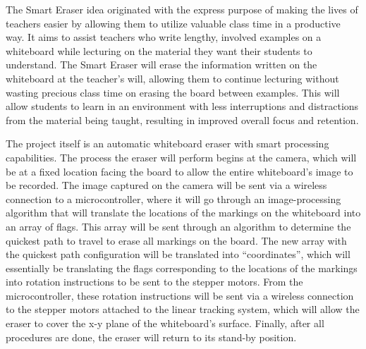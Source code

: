 The Smart Eraser idea originated with the express purpose of making the lives of teachers easier by allowing them to utilize valuable class time in a productive way. It aims to assist teachers who write lengthy, involved examples on a whiteboard while lecturing on the material they want their students to understand. The Smart Eraser will erase the information written on the whiteboard at the teacher's will, allowing them to continue lecturing without wasting precious class time on erasing the board between examples. This will allow students to learn in an environment with less interruptions and distractions from the material being taught, resulting in improved overall focus and retention.\par
 \setlength{\parindent}{2.5ex} The project itself is an automatic whiteboard eraser with smart processing capabilities. The process the eraser will perform begins at the camera, which will be at a fixed location facing the board to allow the entire whiteboard's image to be recorded. The image captured on the camera will be sent via a wireless connection to a microcontroller, where it will go through an image-processing algorithm that will translate the locations of the markings on the whiteboard into an array of flags. This array will be sent through an algorithm to determine the quickest path to travel to erase all markings on the board. The new array with the quickest path configuration will be translated into ``coordinates'', which will essentially be translating the flags corresponding to the locations of the markings into rotation instructions to be sent to the stepper motors. From the microcontroller, these rotation instructions will be sent via a wireless connection to the stepper motors attached to the linear tracking system, which will allow the eraser to cover the x-y plane of the whiteboard's surface. Finally, after all procedures are done, the eraser will return to its stand-by position.

 \newpage
 \thispagestyle{empty}
 \tableofcontents
 \listoffigures
 \thispagestyle{empty}
 \listoftables
 
 \newpage
\setcounter{page}{1}
